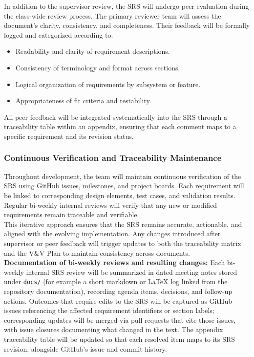 \documentclass[12pt, titlepage]{article}
\begin{document}
\noindent In addition to the supervisor review, the SRS will undergo peer evaluation during the class-wide review process. The primary reviewer team will assess the document’s clarity, consistency, and completeness. Their feedback will be formally logged and categorized according to:\\

\begin{itemize}
  \item Readability and clarity of requirement descriptions.
  \item Consistency of terminology and format across sections.
  \item Logical organization of requirements by subsystem or feature.
  \item Appropriateness of fit criteria and testability.
\end{itemize}

\noindent All peer feedback will be integrated systematically into the SRS through a traceability table within an appendix, ensuring that each comment maps to a specific requirement and its revision status.\\

\subsubsection{Continuous Verification and Traceability Maintenance}

\noindent Throughout development, the team will maintain continuous verification of the SRS using GitHub issues, milestones, and project boards. Each requirement will be linked to corresponding design elements, test cases, and validation results. Regular bi-weekly internal reviews will verify that any new or modified requirements remain traceable and verifiable.\\

\noindent This iterative approach ensures that the SRS remains accurate, actionable, and aligned with the evolving implementation. Any changes introduced after supervisor or peer feedback will trigger updates to both the traceability matrix and the V\&V Plan to maintain consistency across documents.\\

\noindent \textbf{Documentation of bi-weekly reviews and resulting changes:} Each bi-weekly internal SRS review will be summarized in dated meeting notes stored under \texttt{docs/} (for example a short markdown or \LaTeX{} log linked from the repository documentation), recording agenda items, decisions, and follow-up actions. Outcomes that require edits to the SRS will be captured as GitHub issues referencing the affected requirement identifiers or section labels; corresponding updates will be merged via pull requests that cite those issues, with issue closures documenting what changed in the text. The appendix traceability table will be updated so that each resolved item maps to its SRS revision, alongside GitHub's issue and commit history.
\end{document}
